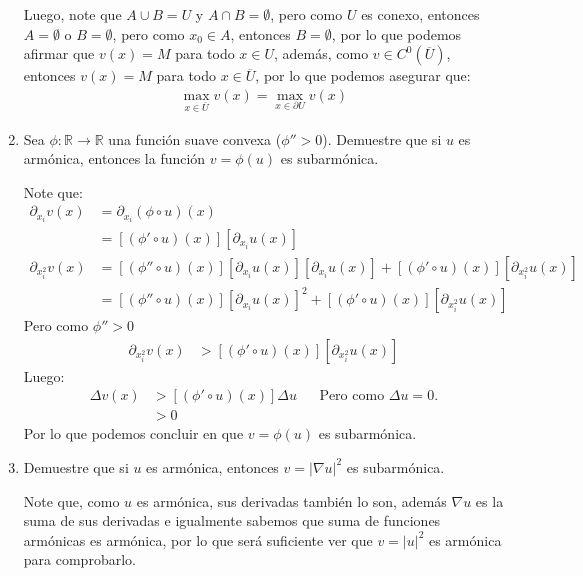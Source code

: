\begin{homeworkProblem}
\begin{enumerate}
\begin{solucion}
        Luego, note que $A\cup B=U$ y $A\cap B=\emptyset$, pero como $U$ es conexo, entonces $A=\emptyset$ o $B=\emptyset$, pero como $x_0\in A$, entonces $B=\emptyset$, por lo que podemos afirmar que $v(x)=M$ para todo $x\in U$, además, como $v\in C^{0}(\overline{U})$, entonces $v(x)=M$ para todo $x\in \overline{U}$, por lo que podemos asegurar que:
        \begin{align*}
          \max_{x\in\overline{U}}v(x)=\max_{x\in\partial U}v(x)
        \end{align*}
        \demostrado
      \end{solucion}
    \item Sea $\phi:\mathbb{R}\rightarrow \mathbb{R}$ una función suave convexa ($\phi''>0$). Demuestre que si $u$ es armónica, entonces la función $v=\phi(u)$ es subarmónica.
      \begin{solucion}
        Note que:
        \begin{align*}
          \partial_{x_i}v(x)&=\partial_{x_i}(\phi \circ u)(x)\\
          &=[(\phi'\circ u)(x)][\partial_{x_i}u(x)]\\
          \partial_{x_i^2}v(x)&=[(\phi''\circ u)(x)][\partial_{x_i}u(x)][\partial_{x_i}u(x)]+[(\phi'\circ u)(x)][\partial_{x_i^2}u(x)]\\
          &=[(\phi''\circ u)(x)][\partial_{x_i}u(x)]^2+[(\phi'\circ u)(x)][\partial_{x_i^2}u(x)]
        \end{align*}
        Pero como $\phi''>0$
        \begin{align*}
          \partial_{x_i^2}v(x)&>[(\phi'\circ u)(x)][\partial_{x_i^2}u(x)]
        \end{align*}
        Luego:
        \begin{align*}
          \Delta v(x)&>[(\phi'\circ u)(x)]\Delta u &&\text{Pero como $\Delta u=0$.}\\
          &>0
        \end{align*}
        Por lo que podemos concluir en que $v=\phi(u)$ es subarmónica.
        \demostrado
      \end{solucion}
    \newpage
    \item Demuestre que si $u$ es armónica, entonces $v=|\nabla u|^2$ es subarmónica.
      \begin{solucion}
        Note que, como $u$ es armónica, sus derivadas también lo son, además $\nabla u$ es la suma de sus derivadas e igualmente sabemos que suma de funciones armónicas es armónica, por lo que será suficiente ver que $v=|u|^2$ es armónica para comprobarlo.\\ 

\end{solucion}
\end{enumerate}
\end{homeworkProblem}
